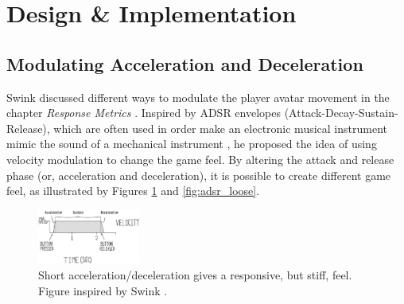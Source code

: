 \section{Design \& Implementation} \label{design}
\subsection{Modulating Acceleration and Deceleration}
Swink discussed different ways to modulate the player avatar movement in the chapter \textit{Response Metrics} \cite{swink}. Inspired by ADSR envelopes (Attack-Decay-Sustain-Release), which are often used in order make an electronic musical instrument mimic the sound of a mechanical instrument \cite{adsr}, he proposed the idea of using velocity modulation to change the game feel. By altering the attack and release phase (or, acceleration and deceleration), it is possible to create different game feel, as illustrated by Figures \ref{fig:adsr_stiff} and \ref{fig:adsr_loose}.





\begin{figure}[htbp]
\centering
\includegraphics[width=0.30\textwidth]{Pics/adsr_stiff}
\caption{Short acceleration/deceleration gives a responsive, but stiff, feel. Figure inspired by Swink \cite{swink}.}
\label{fig:adsr_stiff}
\end{figure}

